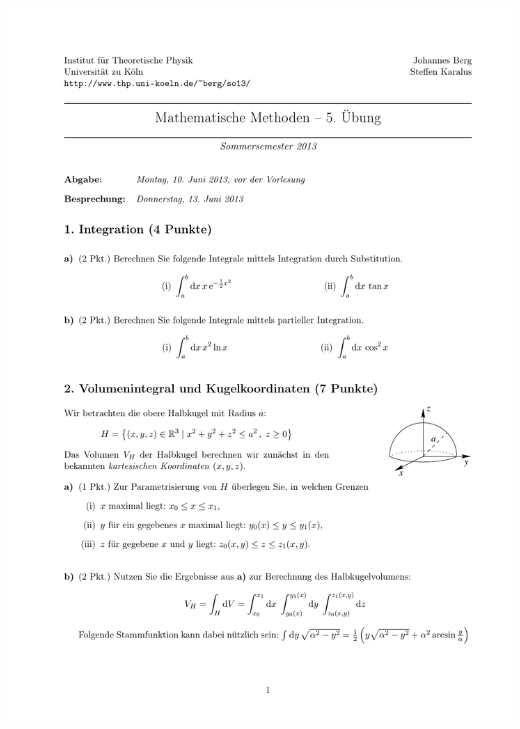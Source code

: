\documentclass{scrartcl}
\begin{document}
\begin{center}
    \includegraphics{img/semicircle.pdf}

\end{center}
\end{document}
